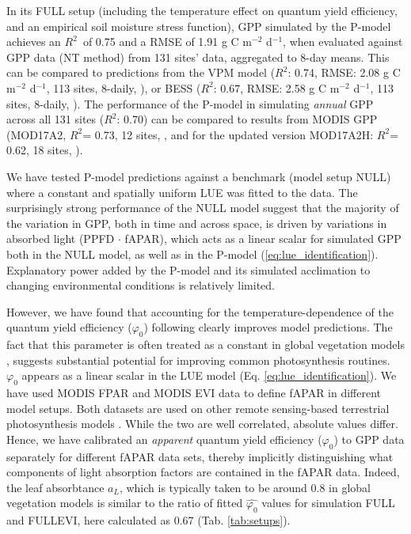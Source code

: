 \documentclass{myreport}
\newcommand{\rsq}{$R^2$}
\begin{document}
In its FULL setup (including the temperature effect on quantum yield efficiency, and an empirical soil moisture stress function), GPP simulated by the P-model achieves an \rsq\ of 0.75 and a RMSE of 1.91 g C m$^{-2}$ d$^{-1}$, when evaluated against GPP data (NT method) from 131 sites' data, aggregated to 8-day means. This can be compared to predictions from the VPM model (\rsq : 0.74, RMSE: 2.08 g C m$^{-2}$ d$^{-1}$, 113 sites, 8-daily, \cite{Zhang2017-yr}), or BESS (\rsq : 0.67, RMSE: 2.58 g C m$^{-2}$ d$^{-1}$, 113 sites, 8-daily, \cite{jiang16rse}). The performance of the P-model in simulating \textit{annual} GPP across all 131 sites (\rsq : 0.70) can be compared to results from MODIS GPP (MOD17A2, \rsq = 0.73, 12 sites, \cite{heinsch06}, and for the updated version MOD17A2H: \rsq = 0.62, 18 sites, \cite{wang17rs}). 

We have tested P-model predictions against a benchmark (model setup NULL) where a constant and spatially uniform LUE was fitted to the data. The surprisingly strong performance of the NULL model suggest that the majority of the variation in GPP, both in time and across space, is driven by variations in absorbed light (PPFD $\cdot$ fAPAR), which acts as a linear scalar for simulated GPP both in the NULL model, as well as in the P-model (\ref{eq:lue_identification}). Explanatory power added by the P-model and its simulated acclimation to changing environmental conditions is relatively limited.

However, we have found that accounting for the temperature-dependence of the quantum yield efficiency ($\varphi_0$) following \cite{bernacchi03pce} clearly improves model predictions. The fact that this parameter is often treated as a constant in global vegetation models \citep{rogers17}, suggests substantial potential for improving common photosynthesis routines. $\varphi_0$ appears as a linear scalar in the LUE model (Eq. \ref{eq:lue_identification}). We have used MODIS FPAR and MODIS EVI data to define fAPAR in different model setups. Both datasets are used on other remote sensing-based terrestrial photosynthesis models \citep{Zhang2017-yr, jiang16rse}. While the two are well correlated, absolute values differ. Hence, we have calibrated an \textit{apparent} quantum yield efficiency ($\widehat{\varphi_0}$) to GPP data separately for different fAPAR data sets, thereby implicitly distinguishing what components of light absorption factors are contained in the fAPAR data. Indeed, the leaf absorbtance $a_L$, which is typically taken to be around 0.8 in global vegetation models \citep{rogers17} is similar to the ratio of fitted $\widehat{\varphi_0}$ values for simulation FULL and FULL\textunderscore EVI, here calculated as 0.67 (Tab. \ref{tab:setups}).
\end{document}
